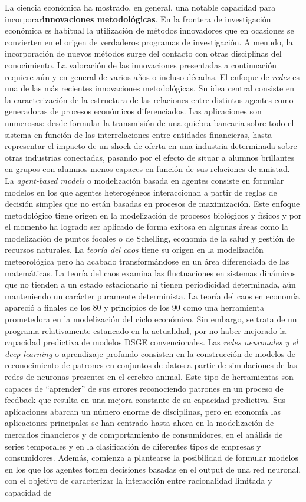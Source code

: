 \documentclass{nuevotema}
\begin{document}
La ciencia económica ha mostrado, en general, una notable capacidad para incorporar\textbf{innovaciones metodológicas}. En la frontera de investigación económica es habitual la utilización de métodos innovadores que en ocasiones se convierten en el origen de verdaderos programas de investigación. A menudo, la incorporación de nuevos métodos surge del contacto con otras disciplinas del conocimiento. La valoración de las innovaciones presentadas a continuación requiere aún y en general de varios años o incluso décadas. El enfoque de \textit{redes} es una de las más recientes innovaciones metodológicas. Su idea central consiste en la caracterización de la estructura de las relaciones entre distintos agentes como generadoras de procesos económicos diferenciados. Las aplicaciones son numerosas: desde formular la transmisión de una quiebra bancaria sobre todo el sistema en función de las interrelaciones entre entidades financieras, hasta representar el impacto de un shock de oferta en una industria determinada sobre otras industrias conectadas, pasando por el efecto de situar a alumnos brillantes en grupos con alumnos menos capaces en función de sus relaciones de amistad. La \textit{agent-based models} o modelización basada en agentes consiste en formular modelos en los que agentes heterogéneos interaccionan a partir de reglas de decisión simples que no están basadas en procesos de maximización. Este enfoque metodológico tiene origen en la modelización de procesos biológicos y físicos y por el momento ha logrado ser aplicado de forma exitosa en algunas áreas como la modelización de puntos focales o de Schelling, economía de la salud y gestión de recursos naturales. La \textit{teoría del caos} tiene su origen en la modelización meteorológica pero ha acabado transformándose en un área diferenciada de las matemáticas. La teoría del caos examina las fluctuaciones en sistemas dinámicos que no tienden a un estado estacionario ni tienen periodicidad determinada, aún manteniendo un carácter puramente determinista. La teoría del caos en economía apareció a finales de los 80 y principios de los 90 como una herramienta prometedora en la modelización del ciclo económico. Sin embargo, se trata de un programa relativamente estancado en la actualidad, por no haber mejorado la capacidad predictiva de modelos DSGE convencionales. Las \textit{redes neuronales y el deep learning} o aprendizaje profundo consisten en la construcción de modelos de reconocimiento de patrones en conjuntos de datos a partir de simulaciones de las redes de neuronas presentes en el cerebro animal. Este tipo de herramientas son capaces de ``aprender'' de sus errores reconociendo patrones en un proceso de feedback que resulta en una mejora constante de su capacidad predictiva. Sus aplicaciones abarcan un número enorme de disciplinas, pero en economía las aplicaciones principales se han centrado hasta ahora en la modelización de mercados financieros y de comportamiento de consumidores, en el análisis de series temporales y en la clasificación de diferentes tipos de empresas y consumidores. Además, comienza a plantearse la posibilidad de formular modelos en los que los agentes tomen decisiones basadas en el output de una red neuronal, con el objetivo de caracterizar la interacción entre racionalidad limitada y capacidad de 
\end{document}
